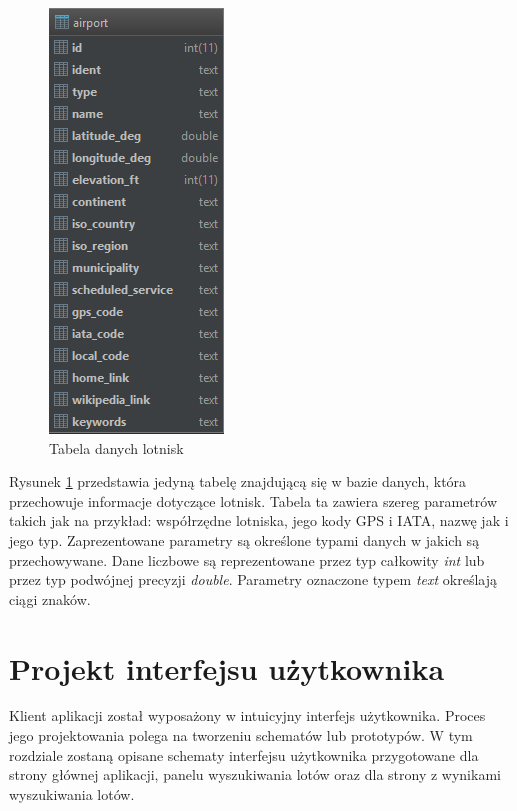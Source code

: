 \documentclass[12pt, twoside]{report}
\begin{document}
\begin{figure}[!ht]
\centering
\includegraphics[scale=1.00, keepaspectratio]{database.png}
\caption{Tabela danych lotnisk}
\label{fig:database}
\end{figure}

\noindent Rysunek \ref{fig:database} przedstawia jedyną tabelę znajdującą się w bazie danych, która przechowuje informacje dotyczące lotnisk. Tabela ta zawiera szereg parametrów takich jak na przykład: współrzędne lotniska, jego kody GPS i IATA, nazwę jak i jego typ. Zaprezentowane parametry są określone typami danych w jakich są przechowywane. Dane liczbowe są reprezentowane przez typ całkowity \textit{int} lub przez typ podwójnej precyzji \textit{double}. Parametry oznaczone typem \textit{text} określają ciągi znaków.

\section{Projekt interfejsu użytkownika}
Klient aplikacji został wyposażony w intuicyjny interfejs użytkownika. Proces jego projektowania polega na tworzeniu schematów lub prototypów. W tym rozdziale zostaną opisane  schematy interfejsu użytkownika przygotowane dla strony głównej aplikacji, panelu wyszukiwania lotów oraz dla strony z wynikami wyszukiwania lotów.
\end{document}
